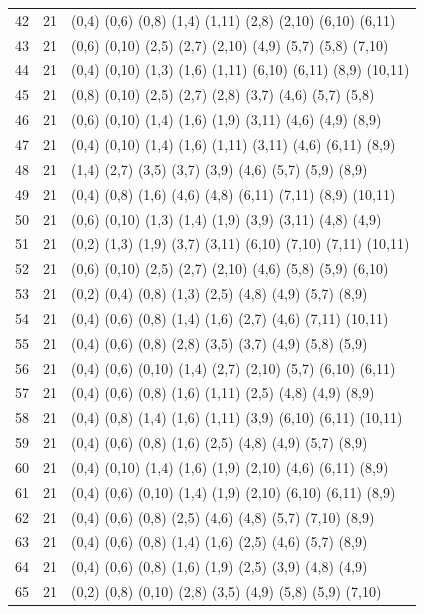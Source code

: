 {\begin{longtable}{lll}
42  & 21 & (0,4) (0,6) (0,8) (1,4) (1,11) (2,8) (2,10) (6,10) (6,11) \\
43  & 21 & (0,6) (0,10) (2,5) (2,7) (2,10) (4,9) (5,7) (5,8) (7,10) \\
44  & 21 & (0,4) (0,10) (1,3) (1,6) (1,11) (6,10) (6,11) (8,9) (10,11) \\
45  & 21 & (0,8) (0,10) (2,5) (2,7) (2,8) (3,7) (4,6) (5,7) (5,8) \\
46  & 21 & (0,6) (0,10) (1,4) (1,6) (1,9) (3,11) (4,6) (4,9) (8,9) \\
47  & 21 & (0,4) (0,10) (1,4) (1,6) (1,11) (3,11) (4,6) (6,11) (8,9) \\
48  & 21 & (1,4) (2,7) (3,5) (3,7) (3,9) (4,6) (5,7) (5,9) (8,9) \\
49  & 21 & (0,4) (0,8) (1,6) (4,6) (4,8) (6,11) (7,11) (8,9) (10,11) \\
50  & 21 & (0,6) (0,10) (1,3) (1,4) (1,9) (3,9) (3,11) (4,8) (4,9) \\
51  & 21 & (0,2) (1,3) (1,9) (3,7) (3,11) (6,10) (7,10) (7,11) (10,11) \\
52  & 21 & (0,6) (0,10) (2,5) (2,7) (2,10) (4,6) (5,8) (5,9) (6,10) \\
53  & 21 & (0,2) (0,4) (0,8) (1,3) (2,5) (4,8) (4,9) (5,7) (8,9) \\
54  & 21 & (0,4) (0,6) (0,8) (1,4) (1,6) (2,7) (4,6) (7,11) (10,11) \\
55  & 21 & (0,4) (0,6) (0,8) (2,8) (3,5) (3,7) (4,9) (5,8) (5,9) \\
56  & 21 & (0,4) (0,6) (0,10) (1,4) (2,7) (2,10) (5,7) (6,10) (6,11) \\
57  & 21 & (0,4) (0,6) (0,8) (1,6) (1,11) (2,5) (4,8) (4,9) (8,9) \\
58  & 21 & (0,4) (0,8) (1,4) (1,6) (1,11) (3,9) (6,10) (6,11) (10,11) \\
59  & 21 & (0,4) (0,6) (0,8) (1,6) (2,5) (4,8) (4,9) (5,7) (8,9) \\
60  & 21 & (0,4) (0,10) (1,4) (1,6) (1,9) (2,10) (4,6) (6,11) (8,9) \\
61  & 21 & (0,4) (0,6) (0,10) (1,4) (1,9) (2,10) (6,10) (6,11) (8,9) \\
62  & 21 & (0,4) (0,6) (0,8) (2,5) (4,6) (4,8) (5,7) (7,10) (8,9) \\
63  & 21 & (0,4) (0,6) (0,8) (1,4) (1,6) (2,5) (4,6) (5,7) (8,9) \\
64  & 21 & (0,4) (0,6) (0,8) (1,6) (1,9) (2,5) (3,9) (4,8) (4,9) \\
65  & 21 & (0,2) (0,8) (0,10) (2,8) (3,5) (4,9) (5,8) (5,9) (7,10) \\

\end{longtable}}

